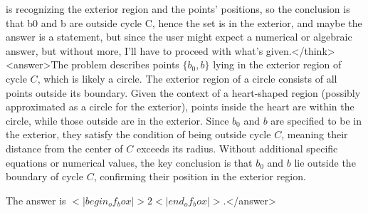 is recognizing the exterior region and the points' positions, so the conclusion is that b0 and b are outside cycle C, hence the set is in the exterior, and maybe the answer is a statement, but since the user might expect a numerical or algebraic answer, but without more, I'll have to proceed with what's given.</think><answer>The problem describes points \( \{b_0, b\} \) lying in the exterior region of cycle \( C \), which is likely a circle. The exterior region of a circle consists of all points outside its boundary. Given the context of a heart-shaped region (possibly approximated as a circle for the exterior), points inside the heart are within the circle, while those outside are in the exterior. Since \( b_0 \) and \( b \) are specified to be in the exterior, they satisfy the condition of being outside cycle \( C \), meaning their distance from the center of \( C \) exceeds its radius. Without additional specific equations or numerical values, the key conclusion is that \( b_0 \) and \( b \) lie outside the boundary of cycle \( C \), confirming their position in the exterior region.  

The answer is \(<|begin_of_box|>2<|end_of_box|>\).</answer>